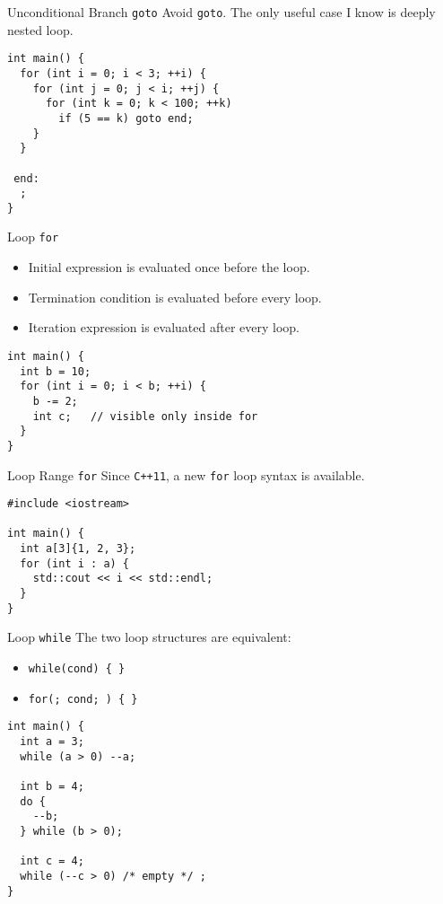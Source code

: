 \documentclass[presentation]{beamer}
\begin{document}
\begin{frame}[fragile,label={sec:orgheadline35}]{Unconditional Branch \texttt{goto}}
 Avoid \texttt{goto}.  The only useful case I know is deeply nested loop.

\begin{verbatim}
int main() {
  for (int i = 0; i < 3; ++i) {
    for (int j = 0; j < i; ++j) {
      for (int k = 0; k < 100; ++k)
        if (5 == k) goto end;
    }
  }

 end:
  ;
}
\end{verbatim}
\end{frame}

\begin{frame}[fragile,label={sec:orgheadline36}]{Loop \texttt{for}}
 \begin{itemize}
\item Initial expression is evaluated \alert{once before} the loop.
\item Termination condition is evaluated \alert{before} every loop.
\item Iteration expression is evaluated \alert{after} every loop.
\end{itemize}


\begin{verbatim}
int main() {
  int b = 10;
  for (int i = 0; i < b; ++i) {
    b -= 2;
    int c;   // visible only inside for
  }
}
\end{verbatim}
\end{frame}

\begin{frame}[fragile,label={sec:orgheadline37}]{Loop Range \texttt{for}}
 Since \texttt{C++11}, a new \texttt{for} loop syntax is available.

\begin{verbatim}
#include <iostream>

int main() {
  int a[3]{1, 2, 3};
  for (int i : a) {
    std::cout << i << std::endl;
  }
}
\end{verbatim}
\end{frame}

\begin{frame}[fragile,label={sec:orgheadline38}]{Loop \texttt{while}}
 The two loop structures are equivalent:
\begin{itemize}
\item \texttt{while(cond) \{ \}}
\item \texttt{for(; cond; ) \{ \}}
\end{itemize}

\begin{verbatim}
int main() {
  int a = 3;
  while (a > 0) --a;

  int b = 4;
  do {
    --b;
  } while (b > 0);

  int c = 4;
  while (--c > 0) /* empty */ ;
}
\end{verbatim}
\end{frame}
\end{document}
